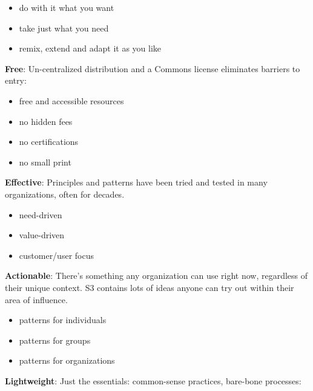 \begin{itemize}
\item do with it what you want

\item take just what you need

\item remix, extend and adapt it as you like

\end{itemize}

\textbf{Free}: Un-centralized distribution and a Commons license eliminates barriers to entry:

\begin{itemize}
\item free and accessible resources

\item no hidden fees

\item no certifications

\item no small print

\end{itemize}

\textbf{Effective}: Principles and patterns have been tried and tested in many organizations, often for decades.

\begin{itemize}
\item need-driven

\item value-driven

\item customer\slash user focus

\end{itemize}

\textbf{Actionable}: There's something any organization can use right now, regardless of their unique context. S3 contains lots of ideas anyone can try out within their area of influence.

\begin{itemize}
\item patterns for individuals

\item patterns for groups

\item patterns for organizations

\end{itemize}

\textbf{Lightweight}: Just the essentials: common-sense practices, bare-bone processes:

